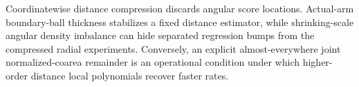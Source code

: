 Coordinatewise distance compression discards angular score locations.  Actual-arm boundary-ball thickness stabilizes a fixed distance estimator, while shrinking-scale angular density imbalance can hide separated regression bumps from the compressed radial experiments.  Conversely, an explicit almost-everywhere joint normalized-coarea remainder is an operational condition under which higher-order distance local polynomials recover faster rates.